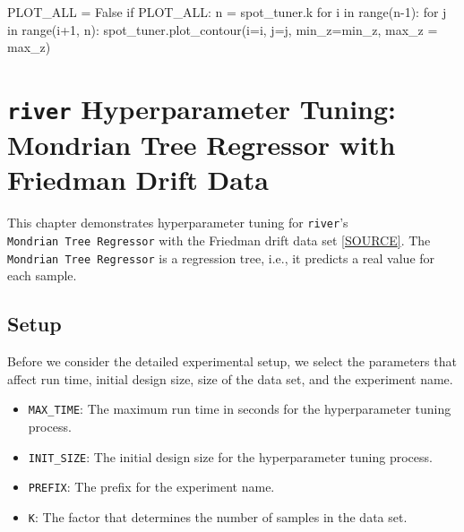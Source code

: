 \documentclass[
  letterpaper,
  DIV=11,
  numbers=noendperiod]{scrreprt}
\newenvironment{Shaded}{\begin{snugshade}}{\end{snugshade}}
\newcommand{\BuiltInTok}[1]{\textcolor[rgb]{0.00,0.23,0.31}{#1}}
\newcommand{\ControlFlowTok}[1]{\textcolor[rgb]{0.00,0.23,0.31}{#1}}
\newcommand{\DecValTok}[1]{\textcolor[rgb]{0.68,0.00,0.00}{#1}}
\newcommand{\KeywordTok}[1]{\textcolor[rgb]{0.00,0.23,0.31}{#1}}
\newcommand{\NormalTok}[1]{\textcolor[rgb]{0.00,0.23,0.31}{#1}}
\newcommand{\OperatorTok}[1]{\textcolor[rgb]{0.37,0.37,0.37}{#1}}
\newcommand{\VariableTok}[1]{\textcolor[rgb]{0.07,0.07,0.07}{#1}}
\providecommand{\tightlist}{%
  \setlength{\itemsep}{0pt}\setlength{\parskip}{0pt}}\usepackage{longtable,booktabs,array}
\begin{document}
\begin{Shaded}
\begin{Highlighting}[]
\NormalTok{PLOT\_ALL }\OperatorTok{=} \VariableTok{False}
\ControlFlowTok{if}\NormalTok{ PLOT\_ALL:}
\NormalTok{    n }\OperatorTok{=}\NormalTok{ spot\_tuner.k}
    \ControlFlowTok{for}\NormalTok{ i }\KeywordTok{in} \BuiltInTok{range}\NormalTok{(n}\OperatorTok{{-}}\DecValTok{1}\NormalTok{):}
        \ControlFlowTok{for}\NormalTok{ j }\KeywordTok{in} \BuiltInTok{range}\NormalTok{(i}\OperatorTok{+}\DecValTok{1}\NormalTok{, n):}
\NormalTok{            spot\_tuner.plot\_contour(i}\OperatorTok{=}\NormalTok{i, j}\OperatorTok{=}\NormalTok{j, min\_z}\OperatorTok{=}\NormalTok{min\_z, max\_z }\OperatorTok{=}\NormalTok{ max\_z)}
\end{Highlighting}
\end{Shaded}

\chapter{\texorpdfstring{\texttt{river} Hyperparameter Tuning: Mondrian
Tree Regressor with Friedman Drift
Data}{river Hyperparameter Tuning: Mondrian Tree Regressor with Friedman Drift Data}}\label{sec-river-hpt-51}

This chapter demonstrates hyperparameter tuning for \texttt{river}'s
\texttt{Mondrian\ Tree\ Regressor} with the Friedman drift data set
\href{https://riverml.xyz/0.18.0/api/datasets/synth/FriedmanDrift/}{{[}SOURCE{]}}.
The \texttt{Mondrian\ Tree\ Regressor} is a regression tree, i.e., it
predicts a real value for each sample.

\section{Setup}\label{sec-setup-51}

Before we consider the detailed experimental setup, we select the
parameters that affect run time, initial design size, size of the data
set, and the experiment name.

\begin{itemize}
\tightlist
\item
  \texttt{MAX\_TIME}: The maximum run time in seconds for the
  hyperparameter tuning process.
\item
  \texttt{INIT\_SIZE}: The initial design size for the hyperparameter
  tuning process.
\item
  \texttt{PREFIX}: The prefix for the experiment name.
\item
  \texttt{K}: The factor that determines the number of samples in the
  data set.
\end{itemize}
\end{document}
